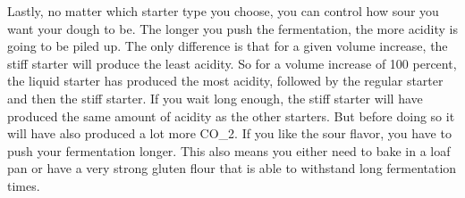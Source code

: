 Lastly, no matter which starter type you choose, you can control how sour
you want your dough to be. The longer you push the fermentation, the more
acidity is going to be piled up. The only difference is that for a given
volume increase, the stiff starter will produce the least acidity. So for a
volume increase of 100 percent, the liquid starter has produced the most acidity,
followed by the regular starter and then the stiff starter. If you wait long
enough, the stiff starter will have produced the same amount of acidity as the
other starters. But before doing so it will have also produced a lot more CO_{2}. If
you like the sour flavor, you have to push your fermentation longer. This also
means you either need to bake in a loaf pan or have a very strong gluten flour
that is able to withstand long fermentation times.
